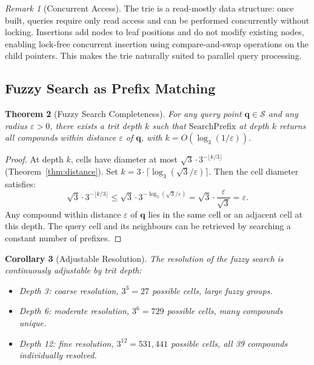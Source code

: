 \documentclass[11pt,twocolumn,a4paper]{article}
\newtheorem{theorem}{Theorem}[section]
\newtheorem{corollary}[theorem]{Corollary}
\theoremstyle{definition}
\theoremstyle{remark}
\newtheorem{remark}[theorem]{Remark}
\newcommand{\Sspace}{\mathcal{S}}
\begin{document}
\begin{remark}[Concurrent Access]
The trie is a read-mostly data structure: once built, queries require only read access and can be performed concurrently without locking. Insertions add nodes to leaf positions and do not modify existing nodes, enabling lock-free concurrent insertion using compare-and-swap operations on the child pointers. This makes the trie naturally suited to parallel query processing.
\end{remark}

\subsection{Fuzzy Search as Prefix Matching}
\label{sec:fuzzy_search}

\begin{theorem}[Fuzzy Search Completeness]
\label{thm:fuzzy}
For any query point $\mathbf{q} \in \Sspace$ and any radius $\varepsilon > 0$, there exists a trit depth $k$ such that $\mathrm{SearchPrefix}$ at depth $k$ returns all compounds within distance $\varepsilon$ of $\mathbf{q}$, with $k = O(\log_3(1/\varepsilon))$.
\end{theorem}

\begin{proof}
At depth $k$, cells have diameter at most $\sqrt{3} \cdot 3^{-\lfloor k/3 \rfloor}$ (Theorem~\ref{thm:distance}). Set $k = 3 \cdot \lceil \log_3(\sqrt{3}/\varepsilon) \rceil$. Then the cell diameter satisfies:
\begin{equation}
\sqrt{3} \cdot 3^{-\lfloor k/3 \rfloor} \leq \sqrt{3} \cdot 3^{-\log_3(\sqrt{3}/\varepsilon)} = \sqrt{3} \cdot \frac{\varepsilon}{\sqrt{3}} = \varepsilon.
\end{equation}
Any compound within distance $\varepsilon$ of $\mathbf{q}$ lies in the same cell or an adjacent cell at this depth. The query cell and its neighbours can be retrieved by searching a constant number of prefixes.
\end{proof}

\begin{corollary}[Adjustable Resolution]
\label{cor:adjustable}
The resolution of the fuzzy search is continuously adjustable by trit depth:
\begin{itemize}[nosep]
\item Depth 3: coarse resolution, $3^3 = 27$ possible cells, large fuzzy groups.
\item Depth 6: moderate resolution, $3^6 = 729$ possible cells, many compounds unique.
\item Depth 12: fine resolution, $3^{12} = 531{,}441$ possible cells, all 39 compounds individually resolved.
\end{itemize}
\end{corollary}
\end{document}
